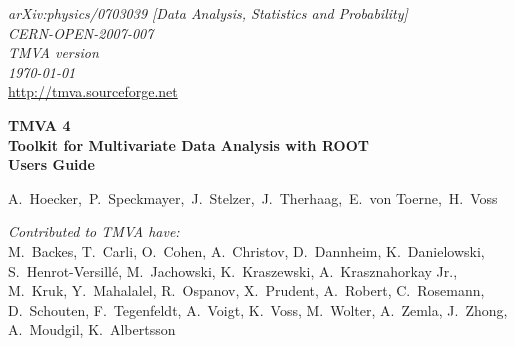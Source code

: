 \vspace{-1cm}
\begin{flushright}
{\sf\em arXiv:physics/0703039 [Data Analysis, Statistics and Probability]} \\
{\sf\em CERN-OPEN-2007-007} \\
{\sf\em TMVA version \TMVAVersion} \\
{\sf\em \today} \\
\def\UrlFont{\sf\em}
\url{http://tmva.sourceforge.net} 
\end{flushright}
\def\UrlFont{\rm}

\def\miniPageOffset{0.2cm}
\def\miniPageWidth{13.5cm}
\HRule
\begin{flushleft}
\hspace{\miniPageOffset}\begin{minipage}{\miniPageWidth}
{\sf\Huge\bfseries\boldmath TMVA 4} \\[0.2cm]
{\sf\Large\bfseries\boldmath Toolkit for Multivariate Data Analysis with ROOT} \\[1cm]
{\sf\Huge\bfseries\boldmath Users Guide} 
\end{minipage}
\end{flushleft}
\HRule
\vspace{2.0cm}
\begin{flushright}
{\sf\Large  A.~Hoecker,~P.~Speckmayer,~J.~Stelzer,~J.~Therhaag,~E.~von Toerne,~H.~Voss} 

\vspace{1.2cm}
{\sf\em\large Contributed to TMVA have:} \\[0.4cm]
{\sf\large 
M.~Backes,
T.~Carli,
O.~Cohen,
A.~Christov, 
D.~Dannheim,
K.~Danielowski,\\[0.1cm]
S.~Henrot-Versill\'e, 
M.~Jachowski, 
K.~Kraszewski,
A.~Krasznahorkay Jr.,  \\[0.1cm]    
M.~Kruk,
Y.~Mahalalel, 
R.~Ospanov, 
X.~Prudent, 
A.~Robert,
C.~Rosemann, \\[0.1cm]  
D.~Schouten, 
F.~Tegenfeldt,
A.~Voigt,
K.~Voss,
M.~Wolter, 
A.~Zemla,
J.~Zhong, \\[0.1cm]
A.~Moudgil,
K.~Albertsson
}

\end{flushright}

